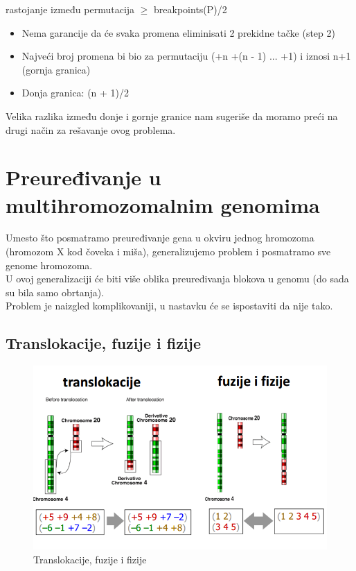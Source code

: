 \hspace{0.5cm} rastojanje između permutacija $\geq$ breakpoints(P)/2\\

\begin{itemize}
\item{Nema garancije da će svaka promena eliminisati 2 prekidne tačke (step 2)}

\item{Najveći broj promena bi bio za permutaciju (+n +(n - 1) ... +1) i iznosi n+1 (gornja granica)}

\item{Donja granica: (n + 1)/2}
\end{itemize}

\noindent Velika razlika između donje i gornje granice nam sugeriše da moramo preći na drugi način za rešavanje ovog problema.
\newpage
\section{Preuređivanje u multihromozomalnim genomima}

Umesto što posmatramo preuređivanje gena u okviru
jednog hromozoma (hromozom X kod čoveka i miša),
generalizujemo problem i posmatramo sve genome
hromozoma.\\

U ovoj generalizaciji će biti više oblika
preuređivanja blokova u genomu (do sada su bila
samo obrtanja).\\

Problem je naizgled komplikovaniji, u nastavku će
se ispostaviti da nije tako.\\

\subsection{Translokacije, fuzije i fizije}

\begin{figure}[h!]
\centering
\includegraphics[scale=0.45]{poglavlja/6/slike/preuredjivanja.PNG}
\caption{Translokacije, fuzije i fizije}
\label{slika:X}
\end{figure}

